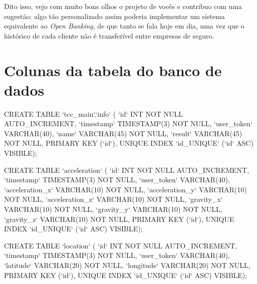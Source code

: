 Dito isso, vejo com muito bons olhos o projeto de vocês e contribuo com uma sugestão: algo tão personalizado assim poderia implementar um sistema equivalente ao \textit{Open Banking}, de que tanto se fala hoje em dia, uma vez que o histórico de cada cliente não é transferível entre empresas de seguro.



\section{Colunas da tabela do banco de dados}

\begin{python}
CREATE TABLE `tcc_main`.`info` (
  `id` INT NOT NULL AUTO_INCREMENT, 
  `timestamp` TIMESTAMP(3) NOT NULL,
  `user_token` VARCHAR(40),
  `name` VARCHAR(45) NOT NULL,
  `result` VARCHAR(45) NOT NULL,
  PRIMARY KEY (`id`),
  UNIQUE INDEX `id_UNIQUE` (`id` ASC) VISIBLE);

CREATE TABLE `acceleration` (
  `id` INT NOT NULL AUTO_INCREMENT,
  `timestamp` TIMESTAMP(3) NOT NULL,
  `user_token` VARCHAR(40),
  `acceleration_x` VARCHAR(10) NOT NULL,
  `acceleration_y` VARCHAR(10) NOT NULL,
  `acceleration_z` VARCHAR(10) NOT NULL,
  `gravity_x` VARCHAR(10) NOT NULL,
  `gravity_y` VARCHAR(10) NOT NULL,
  `gravity_z` VARCHAR(10) NOT NULL,
  PRIMARY KEY (`id`),
  UNIQUE INDEX `id_UNIQUE` (`id` ASC) VISIBLE);

CREATE TABLE `location` (
  `id` INT NOT NULL AUTO_INCREMENT,
  `timestamp` TIMESTAMP(3) NOT NULL,
  `user_token` VARCHAR(40),
  `latitude` VARCHAR(20) NOT NULL,
  `longitude` VARCHAR(20) NOT NULL,
  PRIMARY KEY (`id`),
  UNIQUE INDEX `id_UNIQUE` (`id` ASC) VISIBLE);

  \end{python}


